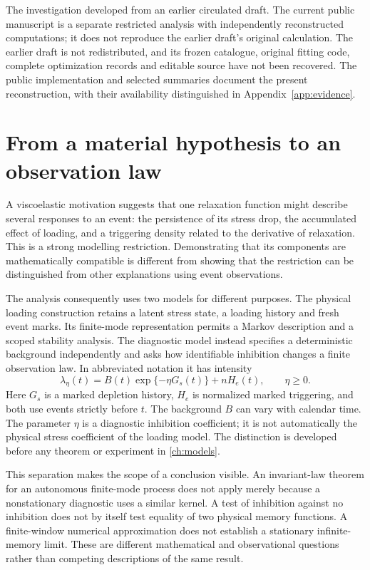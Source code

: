 The investigation developed from an earlier circulated draft. The current public manuscript is a separate restricted analysis with independently reconstructed computations; it does not reproduce the earlier draft's original calculation. The earlier draft is not redistributed, and its frozen catalogue, original fitting code, complete optimization records and editable source have not been recovered. The public implementation and selected summaries document the present reconstruction, with their availability distinguished in Appendix~\ref{app:evidence}.

\section{From a material hypothesis to an observation law}
\label{sec:intro_material_observation}

A viscoelastic motivation suggests that one relaxation function might describe several responses to an event: the persistence of its stress drop, the accumulated effect of loading, and a triggering density related to the derivative of relaxation. This is a strong modelling restriction. Demonstrating that its components are mathematically compatible is different from showing that the restriction can be distinguished from other explanations using event observations.

The analysis consequently uses two models for different purposes. The physical loading construction retains a latent stress state, a loading history and fresh event marks. Its finite-mode representation permits a Markov description and a scoped stability analysis. The diagnostic model instead specifies a deterministic background independently and asks how identifiable inhibition changes a finite observation law. In abbreviated notation it has intensity
\begin{equation}
 \lambda_\eta(t)=B(t)\exp\{-\eta G_s(t)\}+nH_e(t),
 \qquad \eta\geq 0.
 \label{eq:intro_diagnostic}
\end{equation}
Here $G_s$ is a marked depletion history, $H_e$ is normalized marked triggering, and both use events strictly before $t$. The background $B$ can vary with calendar time. The parameter $\eta$ is a diagnostic inhibition coefficient; it is not automatically the physical stress coefficient of the loading model. The distinction is developed before any theorem or experiment in \cref{ch:models}.

This separation makes the scope of a conclusion visible. An invariant-law theorem for an autonomous finite-mode process does not apply merely because a nonstationary diagnostic uses a similar kernel. A test of inhibition against no inhibition does not by itself test equality of two physical memory functions. A finite-window numerical approximation does not establish a stationary infinite-memory limit. These are different mathematical and observational questions rather than competing descriptions of the same result.


